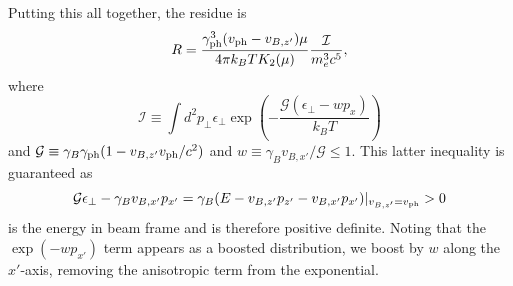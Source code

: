\documentclass[usenatbib,iop,apj,numberedappendix]{aeb_emulateapj_2010}
\def\gph{\gamma_{\rm ph}}
\def\vph{v_{\rm ph}}
\def\cG{\mathcal{G}}
\newcommand{\kI}{\ensuremath{\mathcal{I}}}
\begin{document}

Putting this all together, the residue is
\begin{equation}
R
=
\frac{
  \gph^3 (\vph-v_{B,z'})\mu}{4\pi k_BT K_2(\mu)
}
\frac{\kI}{m_e^3c^5}
,
\label{eq:Rogen}
\end{equation}
where
\begin{equation}\label{eq:I-integral}
\kI \equiv \int d^2\!p_\perp \epsilon_\perp \exp\left(-\frac{\cG(\epsilon_\perp-w p_x)}{k_B T}\right)
\end{equation}
and $\cG\equiv\gamma_B\gph(1-v_{B,z'}\vph/c^2)$ and
$w\equiv \gamma_Bv_{B,x'}/\cG \le 1$.  This latter inequality is guaranteed as 
\begin{equation}
\cG \epsilon_\perp - \gamma_B v_{B,x'} p_{x'} = \gamma_B(E - v_{B,z'} p_{z'} - v_{B,x'}p_{x'})|_{v_{B,z'}=v_{\rm ph}} > 0
\end{equation}
is the energy in beam frame and is therefore positive definite.  Noting that the $\exp(-wp_{x'})$ term appears as a boosted distribution, we boost by $w$
along the $x'$-axis, removing the anisotropic term from the
exponential.  
\end{document}
